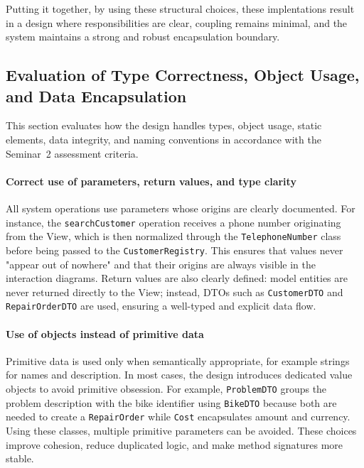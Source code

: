 \documentclass[a4paper]{scrartcl}
\begin{document}
 Putting it together, by using these structural choices, these implentations result in a design where responsibilities are clear, coupling remains minimal, and the system maintains a strong and robust encapsulation boundary.

\subsection{Evaluation of Type Correctness, Object Usage, and Data Encapsulation}

This section evaluates how the design handles types, object usage, static elements, data integrity, and naming conventions in accordance with the Seminar~2 assessment criteria.

\paragraph{Correct use of parameters, return values, and type clarity}
All system operations use parameters whose origins are clearly documented. For instance, the \texttt{searchCustomer} operation receives a phone number originating from the View, which is then normalized through the \texttt{TelephoneNumber} class before being passed to the \texttt{CustomerRegistry}. This ensures that values never "appear out of nowhere" and that their origins are always visible in the interaction diagrams. Return values are also clearly defined: model entities are never returned directly to the View; instead, DTOs such as \texttt{CustomerDTO} and \texttt{RepairOrderDTO} are used, ensuring a well-typed and explicit data flow.

\paragraph{Use of objects instead of primitive data}
Primitive data is used only when semantically appropriate, for example strings for names and description. In most cases, the design introduces dedicated value objects to avoid primitive obsession. For example, \texttt{ProblemDTO} groups the problem description with the bike identifier using \texttt{BikeDTO} because both are needed to create a \texttt{RepairOrder} while \texttt{Cost} encapsulates amount and currency. Using these classes, multiple primitive parameters can be avoided. These choices improve cohesion, reduce duplicated logic, and make method signatures more stable.
\end{document}
